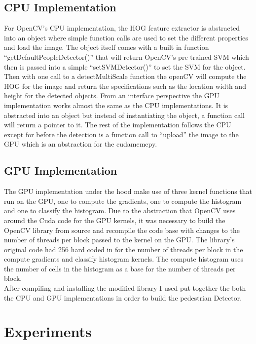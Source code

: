 \documentclass[journal]{IEEEtran}
\begin{document}
\subsection{CPU Implementation}

    For OpenCV’s CPU implementation, the HOG feature extractor is abstracted into an object where simple function calls are used to set the different properties and load the image. The object itself comes with a built in function “getDefaultPeopleDetector()” that will return OpenCV’s pre trained SVM which then is passed into a simple “setSVMDetector()” to set the SVM for the object. Then with one call to a detectMultiScale function the openCV will compute the HOG for the image and return the specifications such as the location width and height for the detected objects.
    From an interface perspective the GPU implementation works almost the same as the CPU implementations. It is abstracted into an object but instead of instantiating the object, a function call will return a pointer to it. The rest of the implementation follows the CPU except for before the detection is a function call to “upload” the image to the GPU which is an abstraction for the cudamemcpy. \\

\subsection{GPU Implementation}

    The GPU implementation under the hood make use of three kernel functions that run on the GPU, one to compute the gradients, one to compute the histogram and one to classify the histogram. Due to the abstraction that OpenCV uses around the Cuda code for the GPU kernels, it was necessary to build the OpenCV library from source and recompile the code base with changes to the number of threads per block passed to the kernel on the GPU.
    The library’s original code had 256 hard coded in for the number of threads per block in the  compute gradients and classify histogram kernels. The compute histogram uses the number of cells in the histogram as a base for the number of threads per block. \\

    After compiling and installing the modified library I used put together the both the CPU and GPU implementations in order to build the pedestrian Detector.



\section{Experiments}
\end{document}
